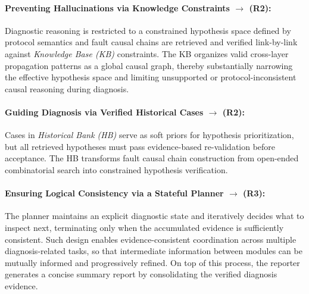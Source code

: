 \documentclass[sigconf,10pt]{acmart} %
\begin{document}
\paragraph{Preventing Hallucinations via Knowledge Constraints $\rightarrow$ (R2): }
Diagnostic reasoning is restricted to a constrained hypothesis space defined by protocol semantics and fault causal chains are retrieved and verified link-by-link against \emph{Knowledge Base (KB)} constraints. The KB organizes valid cross-layer propagation patterns as a global causal graph, thereby substantially narrowing the effective hypothesis space and limiting unsupported or protocol-inconsistent causal reasoning during diagnosis.

\paragraph{Guiding Diagnosis via Verified Historical Cases $\rightarrow$ (R2): }
Cases in \emph{Historical Bank (HB)} serve as soft priors for hypothesis prioritization, but all retrieved hypotheses must pass evidence-based re-validation before acceptance.
The HB transforms fault causal chain construction from open-ended combinatorial search into constrained hypothesis verification.

\paragraph{Ensuring Logical Consistency via a Stateful Planner $\rightarrow$ (R3):}
The planner maintains an explicit diagnostic state and iteratively decides what to inspect next, terminating only when the accumulated evidence is sufficiently consistent. Such design enables evidence-consistent coordination across multiple diagnosis-related tasks, so that intermediate information between modules can be mutually informed and progressively refined. On top of this process, the reporter generates a concise summary report by consolidating the verified diagnosis evidence.
\end{document}
